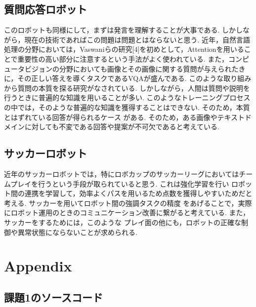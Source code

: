 \documentclass[10pt,a4j]{jsarticle}
\begin{document}
  \subsection{質問応答ロボット}
  このロボットも同様にして，まずは発言を理解することが大事である. しかしながら，現在の技術であればこの問題は問題とはならないと思う.
  近年，自然言語処理の分野においては，Vaswaniらの研究[4]を初めとして，Attentionを用いることで重要性の高い部分に注意するという手法がよく使われている.
  また，コンピュータビジョンの分野においても画像とその画像に関する質問が与えられたきに，その正しい答えを導くタスクであるVQAが盛んである.
  このような取り組みから質問の本質を探る研究がなされている. しかしながら，人間は質問や説明を行うときに普遍的な知識を用いることが多い.
  このようなトレーニングプロセスの中では，そのような普遍的な知識を獲得することはできない. そのため，本質とはずれている回答が得られるケース
  がある. そのため，ある画像やテキストドメインに対しても不変である回答や提案が不可欠であると考えている.

  \subsection{サッカーロボット}
  近年のサッカーロボットでは，特にロボカップのサッカーリーグにおいてはチームプレイを行うという手段が取られていると思う. これは強化学習を行い
  ロボット間の連携を学習して，効率よくパスを用いるため点数を獲得しやすいためだと考える. サッカーを用いてロボット間の強調タスクの精度
  をあげることで，実際にロボット運用のときのコミュニケーション改善に繋がると考えている. また，サッカーをするためには，このような
  プレイ面の他にも，ロボットの正確な制御や異常状態にならないことが求められる.








\section{Appendix}
\subsection{課題1のソースコード}
\end{document}
